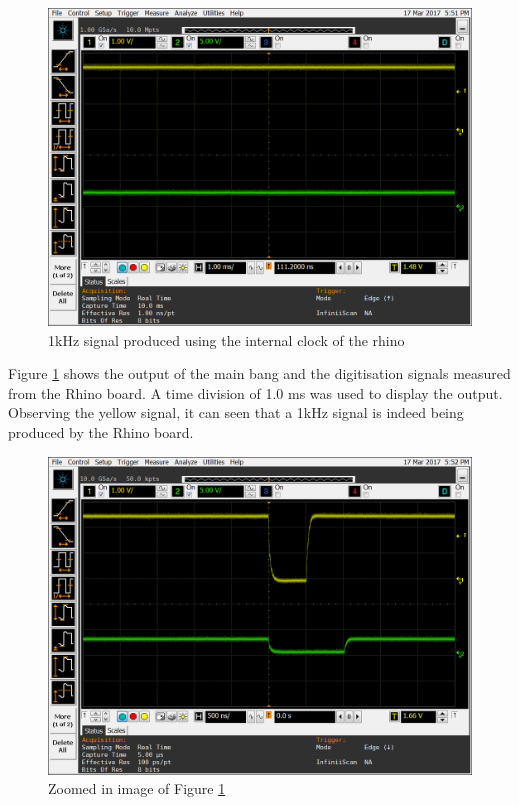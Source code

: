 \documentclass[12pt, a4paper]{article}
\begin{document}
	\begin{figure}[h!]
		\centering
		\includegraphics[width=13cm]{1khz_mb_offset_500_ns}
		\caption{1kHz signal produced using the internal clock of the rhino}
		\label{fig:1kHz_in_500_offset}
	\end{figure}
	
Figure \ref{fig:1kHz_in_500_offset} shows the output of the main bang and the digitisation signals measured from the Rhino board. A time division of 1.0 ms was used to display the output. Observing the yellow signal, it can seen that a 1kHz signal is indeed being produced by the Rhino board.

	\begin{figure}[t]
		\centering
		\includegraphics[width=13cm]{1khz_mb_offset_500_ns_length_of_offset}
		\caption{Zoomed in image of Figure \ref{fig:1kHz_in_500_offset}}
		\label{fig:1kHz_in_500_offset_zoom}
	\end{figure}
		
\end{document}
